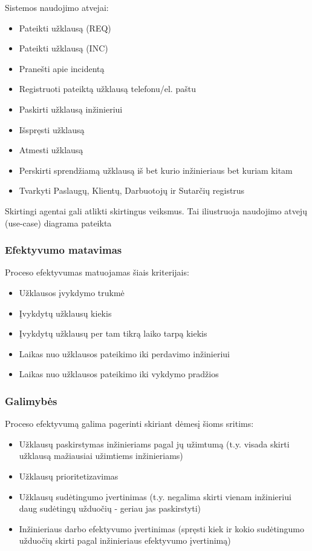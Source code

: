 			Sistemos naudojimo atvejai:
			\begin{itemize}
				\item Pateikti užklausą (REQ)
				\item Pateikti užklausą (INC)
				\item Pranešti apie incidentą
				\item Registruoti pateiktą užklausą telefonu/el. paštu
				\item Paskirti užklausą inžinieriui
				\item Išspręsti užklausą
				\item Atmesti užklausą
				\item Perskirti sprendžiamą užklausą iš bet kurio inžinieriaus bet kuriam kitam
				\item Tvarkyti Paslaugų, Klientų, Darbuotojų ir Sutarčių registrus
			\end{itemize}
			
			Skirtingi agentai gali atlikti skirtingus veiksmus.
			Tai iliustruoja naudojimo atvejų (use-case) diagrama pateikta 


		\subsubsection{Efektyvumo matavimas}
		
			Proceso efektyvumas matuojamas šiais kriterijais:
			\begin{itemize}
				\item Užklausos įvykdymo trukmė
				\item Įvykdytų užklausų kiekis
				\item Įvykdytų užklausų per tam tikrą laiko tarpą kiekis
				\item Laikas nuo užklausos pateikimo iki perdavimo inžinieriui
				\item Laikas nuo užklausos pateikimo iki vykdymo pradžios 
			\end{itemize}
			
		\subsubsection{Galimybės}

			Proceso efektyvumą galima pagerinti skiriant dėmesį šioms sritims:
			\begin{itemize}
				\item Užklausų paskirstymas inžinieriams pagal jų užimtumą
				(t.y. visada skirti užklausą mažiausiai užimtiems inžinieriams)
				\item Užklausų prioritetizavimas
				\item Užklausų sudėtingumo įvertinimas
				(t.y. negalima skirti vienam inžinieriui daug sudėtingų užduočių - geriau jas paskirstyti)
				\item Inžinieriaus darbo efektyvumo įvertinimas
				(spręsti kiek ir kokio sudėtingumo užduočių skirti pagal inžinieriaus efektyvumo įvertinimą)
			\end{itemize}
